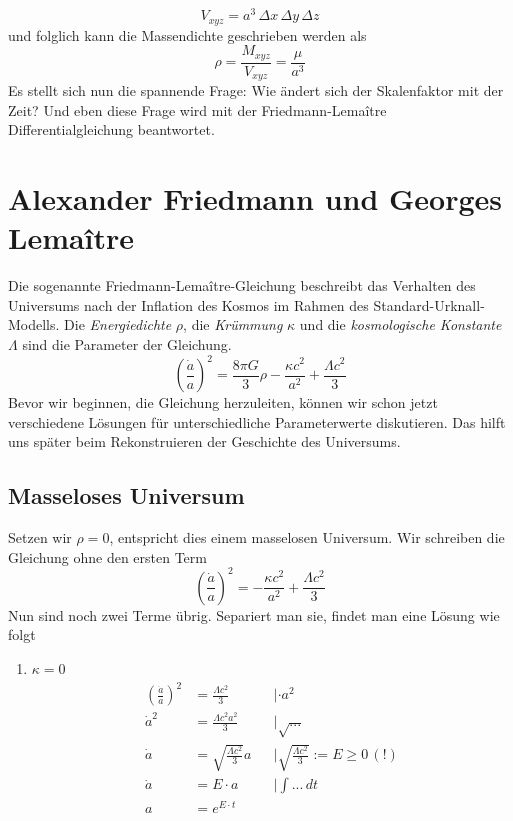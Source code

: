 \begin{refsection}
\begin{equation}
V_{xyz} = a^3 \,\Delta x \,\Delta y \,\Delta z
\end{equation}
und folglich kann die Massendichte geschrieben werden als
\begin{equation}
\rho = \frac{M_{xyz}}{V_{xyz}} = \frac{\mu}{a^3}
\label{friedmann:dichte}
\end{equation}
Es stellt sich nun die spannende Frage: Wie ändert sich der Skalenfaktor mit der Zeit? Und eben diese Frage wird mit der Friedmann-Lema\^{i}tre Differentialgleichung beantwortet.

\section{Alexander Friedmann und Georges Lema\^{i}tre}
Die sogenannte Friedmann-Lema\^{i}tre-Gleichung beschreibt das Verhalten des Universums nach der Inflation des Kosmos im Rahmen des Standard-Urknall-Modells. Die {\em Energiedichte} $\rho$, die {\em Krümmung} $\kappa$ und die {\em kosmologische Konstante} $\Lambda$ sind die Parameter der Gleichung.
\begin{equation}
\left(\frac{\dot{a}}{a}\right) ^2 = \frac{8 \pi G}{3} \rho - \frac{\kappa c^2}{a^2} + \frac{\Lambda c^2}{3}
\end{equation}
Bevor wir beginnen, die Gleichung herzuleiten, können wir schon jetzt verschiedene Lösungen für unterschiedliche Parameterwerte diskutieren. Das hilft uns später beim Rekonstruieren der Geschichte des Universums.

\subsection{Masseloses Universum \label{friedmann:masselosesUniversum}}
Setzen wir $\rho = 0$, entspricht dies einem masselosen Universum.  Wir schreiben die Gleichung ohne den ersten Term
\[\left(\frac{\dot{a}}{a}\right) ^2 = - \frac{\kappa c^2}{a^2} + \frac{\Lambda c^2}{3}\]
Nun sind noch zwei Terme übrig. Separiert man sie, findet man eine Lösung wie folgt
\begin{enumerate}
	\item $\kappa = 0$ 
		\begin{align}
			\nonumber \left(\frac{\dot{a}}{a}\right) ^2 &= \frac{\Lambda c^2}{3}  &&| \cdot a^2 \\
			\nonumber \dot{a} ^2 &= \frac{\Lambda c^2 a^2}{3}  &&|\sqrt{...}\\
			\nonumber \dot{a} &= \sqrt{\frac{\Lambda c^2}{3}} a &&|\sqrt{\frac{\Lambda c^2}{3}} := E \ge 0 \, (!)\\
			\nonumber \dot{a} &= E \cdot a &&|\int ...\, dt \\
			a &= e^{E \cdot t} \label{friedmann:Lambda}
		\end{align}
	

\end{enumerate}
\end{refsection}
